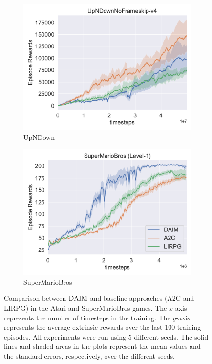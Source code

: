 \begin{figure}[h!]
\begin{subfigure}[t]{0.49\textwidth}
    \includegraphics[width=\textwidth]{figures/chapter5/atari_exp/upndown.pdf}
    \caption{UpNDown}
  \end{subfigure}\hfill
  \begin{subfigure}[t]{0.49\textwidth}
    \includegraphics[width=\textwidth]{figures/chapter5/atari_exp/SuperMarioBros.pdf}
    \caption{SuperMarioBros}
  \end{subfigure}\hfill
  \caption[Results of DAIM in the arcade learning environment.]{Comparison between $\text{DAIM}$ and baseline approaches (A2C and LIRPG) in the Atari and SuperMarioBros games. The $x$-axis represents the number of timesteps in the training. The $y$-axis represents the average extrinsic rewards over the last 100  training episodes. All experiments were run using 5 different seeds. The solid lines and shaded areas in the plots represent the mean values and the standard errors, respectively, over the different seeds.} 
  \label{fig:atari_result}
\end{figure}


